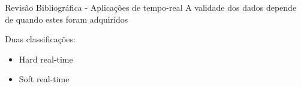 \begin{frame}{Revis\~{a}o Bibliogr\'{a}fica - Aplicações de tempo-real}
	A validade dos dados depende de quando estes foram adquir\'{i}dos
	
	\medskip
	Duas classificações:
	\begin{itemize}
		\item Hard real-time
		\item Soft real-time
	\end{itemize}
\end{frame}